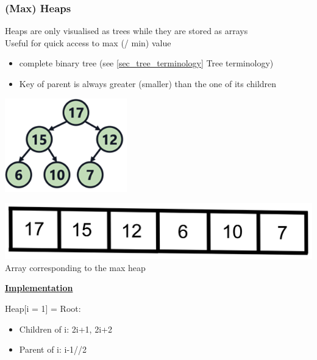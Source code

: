 \subsubsection{(Max) Heaps}
    Heaps are only visualised as trees while they are stored as arrays\\
    Useful for quick access to max (/ min) value
    \begin{itemize}
        \item complete binary tree (see \ref{sec_tree_terminology} Tree terminology)
        \item Key of parent is always greater (smaller) than the one of its children
    \end{itemize}
    \begin{minipage}{0.49\linewidth}
        \includegraphics[width = 0.95\linewidth]{src/4_data_structure/images/max_heap.png}
    \end{minipage}
    \begin{minipage}{0.49\linewidth}
        \includegraphics[width = 0.95\linewidth]{src/4_data_structure/images/max_heap_array.png}
        Array corresponding to the max heap
    \end{minipage}

    {\centering\underline{\textbf{Implementation}} \par}
        Heap[i = 1] = Root:\\
        \begin{itemize}
            \item Children of i: {2i+1, 2i+2}
            \item Parent of i: i-1//2
        \end{itemize}

